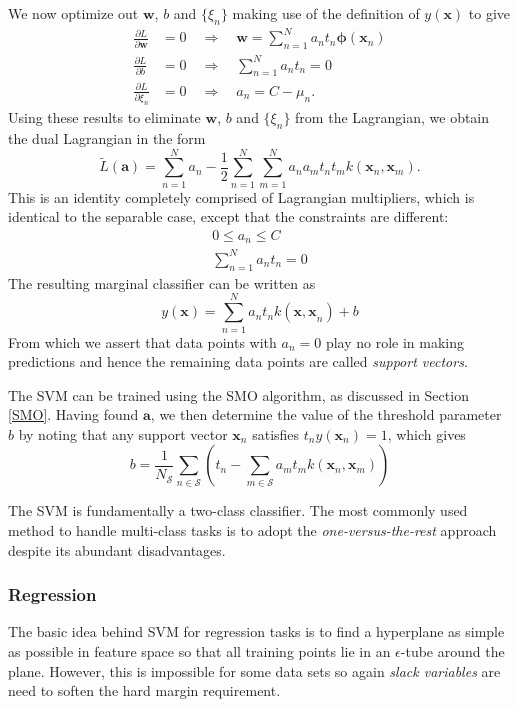 \documentclass[a4paper]{report}
\renewcommand{\bf}{\mathbf}
\renewcommand{\cal}{\mathcal}
\newcommand{\imp}[1]{{\color{blue}\textit{#1}}}
\newcommand{\bs}{\boldsymbol}
\begin{document}
We now optimize out $\bf{w}$, $b$ and $\{\xi_n\}$ making use of the definition of $y(\bf{x})$ to give
\begin{align}
	\frac{\partial L}{\partial \bf{w}} &= 0 \quad \Rightarrow \quad \bf{w} = \sum_{n=1}^N a_n t_n \bs{\phi}(\bf{x}_n) \\
	\frac{\partial L}{\partial b} &= 0 \quad \Rightarrow \quad \sum_{n=1}^N a_n t_n = 0\\
	\frac{\partial L}{\partial \xi_n} &= 0  \quad \Rightarrow \quad a_n = C -\mu_n.
\end{align}
Using these results to eliminate $\bf{w}$, $b$ and $\{\xi_n\}$ from the Lagrangian, we obtain the dual Lagrangian in the form
\begin{equation}
	\tilde{L}(\bf{a}) = \sum_{n=1}^N a_n -\frac{1}{2} \sum_{n=1}^N \sum_{m=1}^N a_n a_m t_n t_m k(\bf{x}_n,\bf{x}_m).
\end{equation}
This is an identity completely comprised of Lagrangian multipliers, which is identical to the separable case, except that the constraints are different:
\begin{align}
	0 \leq a_n \leq C \\
	\sum_{n=1}^N a_n t_n = 0
\end{align}
The resulting marginal classifier can be written as
\begin{equation}
	y(\bf{x}) = \sum_{n=1}^N a_n t_n k(\bf{x,x}_n) + b
\end{equation}
From which we assert that data points with $a_n = 0$ play no role in making predictions and hence the remaining data points are called \imp{support vectors}.

The SVM can be trained using the SMO algorithm, as discussed in Section \ref{SMO}. Having found $\bf{a}$, we then determine the value of the threshold parameter $b$ by noting that any support vector $\bf{x}_n$ satisfies $t_ny(\bf{x}_n) = 1$, which gives
\begin{equation}
	b = \frac{1}{N_{\cal{S}}} \sum_{n \in \cal{S}} \left( t_n - \sum_{m \in \cal{S}} a_m t_m k(\bf{x}_n,\bf{x}_m) \right)
\end{equation}

The SVM is fundamentally a two-class classifier. The most commonly used method to handle multi-class tasks is to adopt the \imp{one-versus-the-rest} approach despite its abundant disadvantages.

\subsubsection{Regression}
The basic idea behind SVM for regression tasks is to find a hyperplane as simple as possible in feature space so that all training points lie in an $\epsilon$-tube around the plane. However, this is impossible for some data sets so again \imp{slack variables} are need to soften the hard margin requirement.
\end{document}
